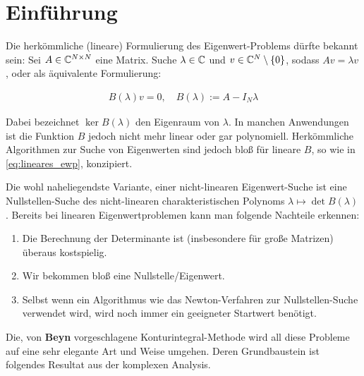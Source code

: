 \section{Einführung}

Die herkömmliche (lineare) Formulierung des Eigenwert-Problems dürfte bekannt sein:
Sei $A \in \mathbb{C}^{N \times N}$ eine Matrix.
Suche $\lambda \in \mathbb{C}$ und $v \in \mathbb{C}^N \setminus {\left \{ 0 \right \}}$, sodass $A v = \lambda v$,
oder als äquivalente Formulierung:

\begin{align} \label{eq:lineares_ewp}
    B(\lambda) v = 0,
    \quad
    B(\lambda) := A - I_N \lambda
\end{align}

Dabei bezeichnet $\ker B(\lambda)$ den Eigenraum von $\lambda$.
In manchen Anwendungen ist die Funktion $B$ jedoch nicht mehr linear oder gar polynomiell.
Herkömmliche Algorithmen zur Suche von Eigenwerten sind jedoch bloß für lineare $B$, so wie in \eqref{eq:lineares_ewp}, konzipiert.

Die wohl naheliegendste Variante, einer nicht-linearen Eigenwert-Suche ist eine Nullstellen-Suche des nicht-linearen charakteristischen Polynoms $\lambda \mapsto \det B(\lambda)$.
Bereits bei linearen Eigenwertproblemen kann man folgende Nachteile erkennen:

\begin{enumerate}[label = \arabic*.]
    \item Die Berechnung der Determinante ist (insbesondere für große Matrizen) überaus kostspielig.
    \item Wir bekommen bloß eine Nullstelle/Eigenwert.
    \item Selbst wenn ein Algorithmus wie das Newton-Verfahren zur Nullstellen-Suche verwendet wird, wird noch immer ein geeigneter Startwert benötigt.
\end{enumerate}

Die, von \textbf{Beyn} vorgeschlagene Konturintegral-Methode wird all diese Probleme auf eine sehr elegante Art und Weise umgehen.
Deren Grundbaustein ist folgendes Resultat aus der komplexen Analysis.
